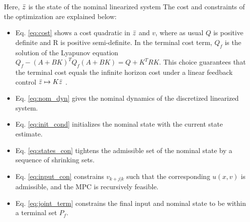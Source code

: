 Here, $\bar{z}$ is the state of the nominal linearized system
The cost and constraints of the optimization are explained below:
\begin{itemize}
\item Eq. \eqref{eq:cost} shows a cost quadratic in $\bar{z}$ and $v$, where as usual $Q$ is positive definite and R is positive semi-definite. 
In the terminal cost term, $Q_f$ is the solution of the Lyapunov equation $Q_f-(A+BK)^{T}Q_f(A+BK) = Q+K^{T}RK$.
This choice guarantees that the terminal cost equals the infinite horizon cost under a linear feedback control $\bar{z} \mapsto K\bar{z}$ \cite{CannonK15MPC}.

\item Eq. \eqref{eq:nom_dyn} gives the nominal dynamics of the discretized linearized system.

\item Eq. \eqref{eq:init_cond} initializes the nominal state with the current state estimate.

\item Eq. \eqref{eq:states_con} tightens the admissible set of the nominal state by a sequence of shrinking sets.

\item Eq. \eqref{eq:input_con} constrains $v_{k+j|k}$ such that the corresponding $u(x,v)$ is admissible, and the MPC is recursively feasible.

\item Eq. \eqref{eq:joint_term} constrains the final input and nominal state to be within a terminal set $P_f$.

\end{itemize}





